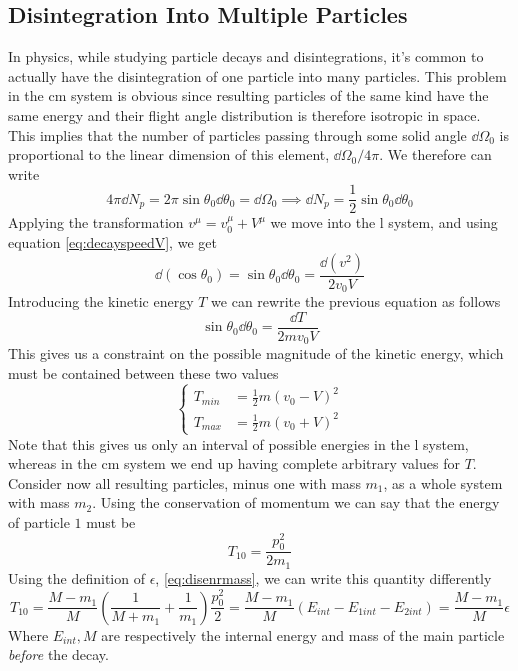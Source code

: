 \documentclass[../admech.tex]{subfiles}
\begin{document}
\subsection{Disintegration Into Multiple Particles}
In physics, while studying particle decays and disintegrations, it's common to actually have the disintegration of one particle into many particles. This problem in the cm system is obvious since resulting particles of the same kind have the same energy and their flight angle distribution is therefore isotropic in space.\\
This implies that the number of particles passing through some solid angle $\dd\Omega_0$ is proportional to the linear dimension of this element, $\dd\Omega_0/4\pi$. We therefore can write
\begin{equation}
	4\pi\dd{N_p}=2\pi\sin\theta_0\dd\theta_0=\dd\Omega_0\implies\dd{N_p}=\frac{1}{2}\sin\theta_0\dd\theta_0
	\label{eq:Ndisnumb0}
\end{equation}
Applying the transformation $v^\mu=v_0^\mu+V^\mu$ we move into the l system, and using equation \eqref{eq:decayspeedV}, we get
\begin{equation}
	\dd(\cos\theta_0)=\sin\theta_0\dd\theta_0=\frac{\dd(v^2)}{2v_0V}
	\label{eq:Ndiscml}
\end{equation}
Introducing the kinetic energy $T$ we can rewrite the previous equation as follows
\begin{equation}
	\sin\theta_0\dd\theta_0=\frac{\dd{T}}{2mv_0V}
	\label{eq:NdiscmlT}
\end{equation}
This gives us a constraint on the possible magnitude of the kinetic energy, which must be contained between these two values
\begin{equation}
	\left\{ \begin{aligned}
			T_{min}&=\frac{1}{2}m\left( v_0-V \right)^2\\
			T_{max}&=\frac{1}{2}m\left( v_0+V \right)^2
	\end{aligned}\right.
	\label{eq:NdisTminmax}
\end{equation}
Note that this gives us only an interval of possible energies in the l system, whereas in the cm system we end up having complete arbitrary values for $T$.\\
Consider now all resulting particles, minus one with mass $m_1$, as a whole system with mass $m_2$. Using the conservation of momentum we can say that the energy of particle $1$ must be
\begin{equation}
	T_{10}=\frac{p_0^2}{2m_1}
	\label{eq:part1T}
\end{equation}
Using the definition of $\epsilon$, \eqref{eq:disenrmass}, we can write this quantity differently
\begin{equation}
	T_{10}=\frac{M-m_1}{M}\left( \frac{1}{M+m_1}+\frac{1}{m_1} \right)\frac{p_0^2}{2}=\frac{M-m_1}{M}\left( E_{int}-E_{1int}-E_{2int} \right)=\frac{M-m_1}{M}\epsilon
	\label{eq:disenNpartT}
\end{equation}
Where $E_{int},M$ are respectively the internal energy and mass of the main particle \emph{before} the decay.
\end{document}
